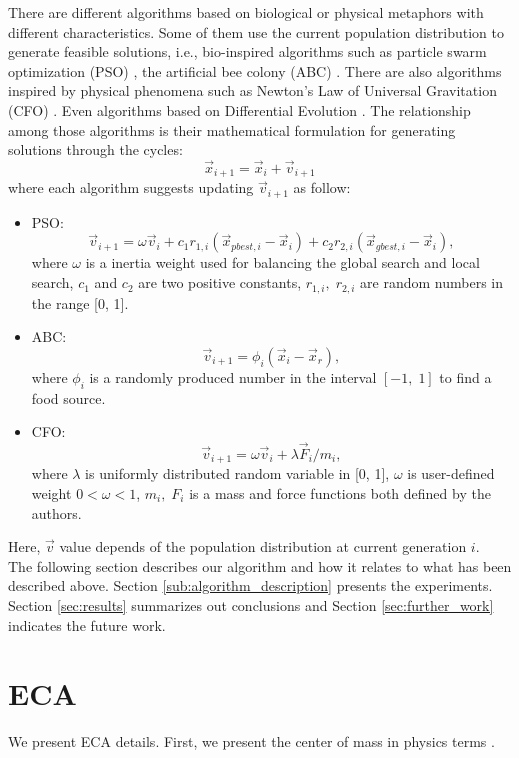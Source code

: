 \documentclass[graybox]{svmult}
\begin{document}
There are different algorithms based on biological or physical metaphors with 
different characteristics. Some of them use the current population distribution 
to generate feasible solutions, i.e., bio-inspired algorithms such as particle 
swarm optimization (PSO) \cite{pso1995}, the artificial bee colony (ABC) \cite{abc2005}. 
There are also algorithms inspired by physical phenomena such as Newton's Law of 
Universal Gravitation (CFO) \cite{fisicaSurvey, cfo2007}. Even algorithms based 
on Differential Evolution  \cite{jso2017, ed1995}. The relationship among those 
algorithms  is their mathematical formulation for generating solutions through the cycles:
%
\begin{equation}
	\vec{x}_{i + 1} = \vec{x}_{i} + \vec{v}_{i + 1}
	\label{eqn:xxv}
\end{equation}
%
where each algorithm suggests updating $\vec{v}_{i+1} $ as follow:
\begin{itemize}
	\item PSO:
		$$
			\vec{v}_{i + 1} = \omega \vec{v}_{i} +  
					c_1 r_{1, i} ( \vec{x}_{pbest, i} - \vec{x}_i ) + 
					c_2 r_{2, i} ( \vec{x}_{gbest, i} - \vec{x}_i ),
		$$
		where $\omega$ is a inertia weight used for balancing the global search 
		and local search, $c_1$ and $c_2$ are two positive constants, $r_{1, i},\; r_{2, i}$ 
		are random numbers in the range [0, 1].
	\item ABC:
		$$
			\vec{v}_{i + 1} = \phi_i (\vec{x}_i - \vec{x}_{r}),
		$$
	where $\phi_i$ is a randomly produced number in the interval $[-1,\;1]$ to 
	find a food source.
	\item CFO: $$
		\vec{v}_{i + 1} = \omega \vec{v}_{i} + {\lambda \vec{F}_{i}} / {m_i},
		$$
		where $\lambda$ is uniformly distributed random variable in [0, 1], $\omega$ 
		is user-defined weight $0 < \omega < 1$, $m_i,\; F_i$ is a mass and force 
		functions both defined by the authors.
\end{itemize}
%
%
Here, $\vec{v}$ value  depends of the population distribution at current generation $i$.\\

The following section describes our algorithm and how it relates to what has been 
described above. Section \ref{sub:algorithm_description} presents the experiments. 
Section \ref{sec:results} summarizes out conclusions and Section \ref{sec:further_work} 
indicates the future work. 

\section{ECA} %
\label{sec:eca}
%
%
We present ECA details. First, we present the center of mass in physics terms \cite{kleppner73,serway}.
\end{document}
